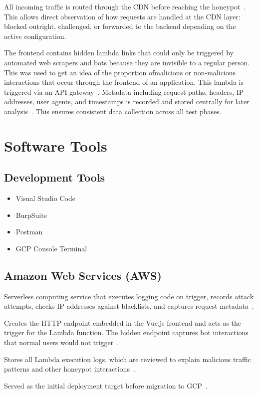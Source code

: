 \documentclass[12pt, a4paper]{report}   %
\begin{document}
All incoming traffic is routed through the CDN before reaching the 
honeypot~\cite{cf-reverse-proxy}. This allows direct observation of how requests are 
handled at the CDN layer: blocked outright, challenged, or forwarded to the backend 
depending on the active configuration.

The frontend contains hidden lambda links that could only be triggered by automated web scrapers and bots because they are invisible to a regular person. This was used to get an idea of the proportion ofmalicious or non-malicious interactions that occur through the frontend of an application. This lambda is 
triggered via an API gateway~\cite{aws-gateway}. Metadata including request paths, 
headers, IP addresses, user agents, and timestamps is recorded and stored centrally 
for later analysis~\cite{aws-cloudwatch}. This ensures consistent data collection 
across all test phases.

\section{Software Tools}

\subsection{Development Tools}

\begin{itemize}
  \item Visual Studio Code
  \item BurpSuite~\cite{burpsuite}
  \item Postman
  \item GCP Console Terminal
\end{itemize}

\subsection{Amazon Web Services (AWS)}

\begin{description}[leftmargin=3cm, style=nextline]

  \item[Lambda]
    Serverless computing service that executes logging code on trigger, records attack
    attempts, checks IP addresses against blacklists, and captures request
    metadata~\cite{aws-lambda}.

  \item[API Gateway]
    Creates the HTTP endpoint embedded in the Vue.js frontend and acts as the trigger
    for the Lambda function. The hidden endpoint captures bot interactions that normal
    users would not trigger~\cite{aws-gateway}.

  \item[CloudWatch]
    Stores all Lambda execution logs, which are reviewed to explain malicious traffic
    patterns and other honeypot interactions~\cite{aws-cloudwatch}.

  \item[EC2]
    Served as the initial deployment target
    before migration to GCP~\cite{aws-ec2}.

\end{description}
\end{document}
